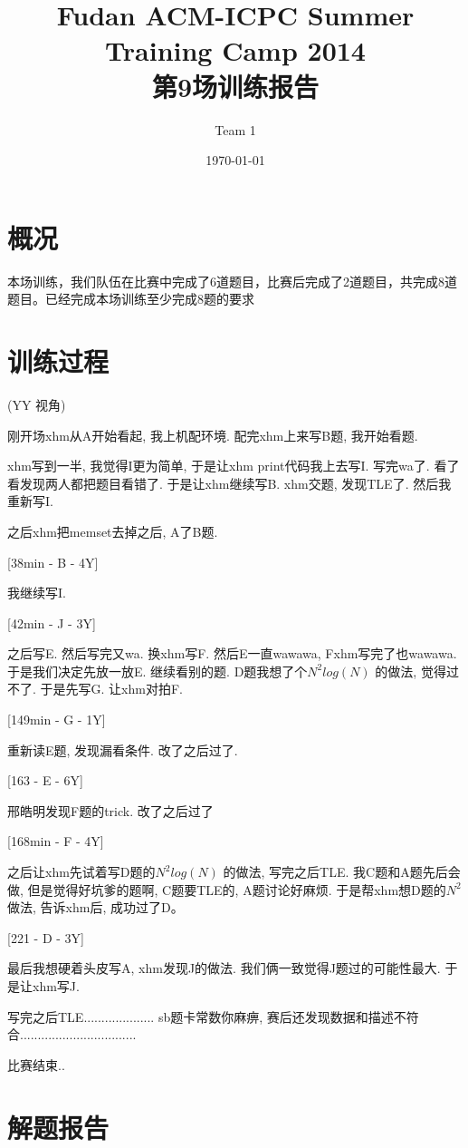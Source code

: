 \documentclass[a4paper, 11pt, nofonts, nocap, fancyhdr]{ctexart}
\title{Fudan ACM-ICPC Summer Training Camp 2014\\第9场训练报告}
\author{Team 1}
\date{\today}
\begin{document}
\maketitle

\section{概况}

本场训练，我们队伍在比赛中完成了6道题目，比赛后完成了2道题目，共完成8道题目。已经完成本场训练至少完成8题的要求

\section{训练过程}

(YY 视角)

刚开场xhm从A开始看起, 我上机配环境. 配完xhm上来写B题, 我开始看题.

xhm写到一半, 我觉得I更为简单, 于是让xhm print代码我上去写I. 写完wa了. 看了看发现两人都把题目看错了. 于是让xhm继续写B. xhm交题, 发现TLE了. 然后我重新写I. 

之后xhm把memset去掉之后, A了B题. 

[38min - B - 4Y]

我继续写I. 

[42min - J - 3Y]

之后写E. 然后写完又wa. 换xhm写F. 然后E一直wawawa, Fxhm写完了也wawawa. 于是我们决定先放一放E. 继续看别的题. D题我想了个$N^2log(N)$ 的做法, 觉得过不了. 于是先写G. 让xhm对拍F.

[149min - G - 1Y]

重新读E题, 发现漏看条件. 改了之后过了. 

[163 - E - 6Y]

邢皓明发现F题的trick. 改了之后过了

[168min - F - 4Y]

之后让xhm先试着写D题的$N^2log(N)$ 的做法, 写完之后TLE. 我C题和A题先后会做, 但是觉得好坑爹的题啊, C题要TLE的, A题讨论好麻烦. 于是帮xhm想D题的$N^2$做法, 告诉xhm后, 成功过了D。

[221 - D - 3Y]

最后我想硬着头皮写A, xhm发现J的做法. 我们俩一致觉得J题过的可能性最大. 于是让xhm写J.

写完之后TLE.................... sb题卡常数你麻痹, 赛后还发现数据和描述不符合.................................

比赛结束..

\section{解题报告}
\end{document}
